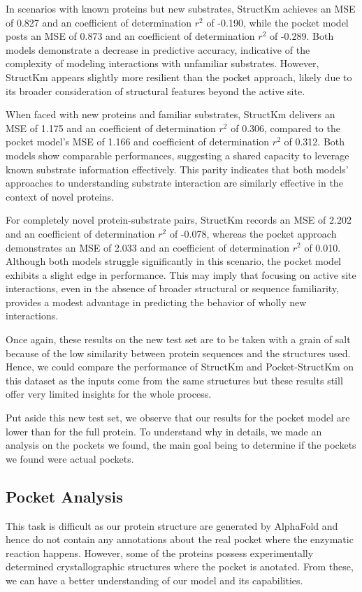 In scenarios with known proteins but new substrates, StructKm achieves an MSE of 0.827 and an coefficient of determination $r^2$ of -0.190, while the pocket model posts an MSE of 0.873 and an coefficient of determination $r^2$ of -0.289. Both models demonstrate a decrease in predictive accuracy, indicative of the complexity of modeling interactions with unfamiliar substrates. However, StructKm appears slightly more resilient than the pocket approach, likely due to its broader consideration of structural features beyond the active site.

When faced with new proteins and familiar substrates, StructKm delivers an MSE of 1.175 and an coefficient of determination $r^2$ of 0.306, compared to the pocket model's MSE of 1.166 and coefficient of determination $r^2$ of 0.312. Both models show comparable performances, suggesting a shared capacity to leverage known substrate information effectively. This parity indicates that both models' approaches to understanding substrate interaction are similarly effective in the context of novel proteins.

For completely novel protein-substrate pairs, StructKm records an MSE of 2.202 and an coefficient of determination $r^2$ of -0.078, whereas the pocket approach demonstrates an MSE of 2.033 and an coefficient of determination $r^2$ of 0.010. Although both models struggle significantly in this scenario, the pocket model exhibits a slight edge in performance. This may imply that focusing on active site interactions, even in the absence of broader structural or sequence familiarity, provides a modest advantage in predicting the behavior of wholly new interactions.

Once again, these results on the new test set are to be taken with a grain of salt because of the low similarity between protein sequences and the structures used. Hence, we could compare the performance of StructKm and Pocket-StructKm on this dataset as the inputs come from the same structures but these results still offer very limited insights for the whole process.

Put aside this new test set, we observe that our results for the pocket model are lower than for the full protein. To understand why in details, we made an analysis on the pockets we found, the main goal being to determine if the pockets we found were actual pockets. 

\subsection{Pocket Analysis}
This task is difficult as our protein structure are generated by AlphaFold and hence do not contain any annotations about the real pocket where the enzymatic reaction happens. However, some of the proteins possess experimentally determined crystallographic structures where the pocket is anotated. From  these, we can have a better understanding of our model and its capabilities.

